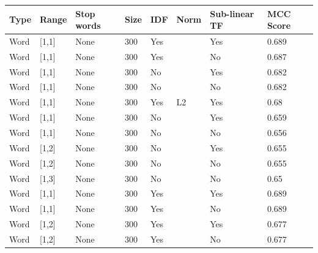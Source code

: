 \begin{table}[h]
  \begin{center}
  \begin{tabular}{ l l l l l l l l }
    \toprule
    Type & Range & Stop words & Size & IDF & Norm & Sub-linear TF & MCC Score \\
    \midrule
    Word & [1,1] & None & 300 & Yes &  & Yes & 0.689 \\
    Word & [1,1] & None & 300 & Yes &  & No & 0.687 \\
    Word & [1,1] & None & 300 & No &  & Yes & 0.682 \\
    Word & [1,1] & None & 300 & No &  & No & 0.682 \\
    Word & [1,1] & None & 300 & Yes & L2 & Yes & 0.68 \\
    \midrule
    Word & [1,1] & None & 300 & No & & Yes & 0.659  \\
    Word & [1,1] & None & 300 & No & & No & 0.656 \\
    Word & [1,2] & None & 300 & No & & Yes & 0.655 \\
    Word & [1,2] & None & 300 & No & & No & 0.655 \\
    Word & [1,3] & None & 300 & No & & No & 0.65 \\
    \midrule
    Word & [1,1] & None & 300 & Yes & & Yes & 0.689 \\
    Word & [1,1] & None & 300 & Yes & & No  & 0.689 \\
    Word & [1,2] & None & 300 & Yes & & Yes & 0.677 \\
    Word & [1,2] & None & 300 & Yes & & No  & 0.677 \\

\end{tabular}
\end{center}
\end{table}
